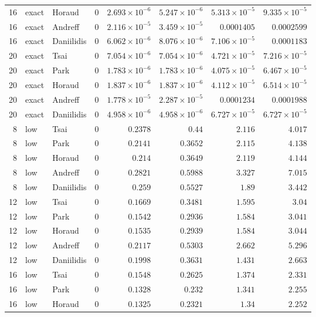 \begin{longtable}{rllrrrrr}
16 & exact & Horaud & 0 & $2.693\times10^{-6}$ & $5.247\times10^{-6}$ & $5.313\times10^{-5}$ & $9.335\times10^{-5}$ \\
16 & exact & Andreff & 0 & $2.116\times10^{-5}$ & $3.459\times10^{-5}$ & $0.0001405$ & $0.0002599$ \\
16 & exact & Daniilidis & 0 & $6.062\times10^{-6}$ & $8.076\times10^{-6}$ & $7.106\times10^{-5}$ & $0.0001183$ \\
20 & exact & Tsai & 0 & $7.054\times10^{-6}$ & $7.054\times10^{-6}$ & $4.721\times10^{-5}$ & $7.216\times10^{-5}$ \\
20 & exact & Park & 0 & $1.783\times10^{-6}$ & $1.783\times10^{-6}$ & $4.075\times10^{-5}$ & $6.467\times10^{-5}$ \\
20 & exact & Horaud & 0 & $1.837\times10^{-6}$ & $1.837\times10^{-6}$ & $4.112\times10^{-5}$ & $6.514\times10^{-5}$ \\
20 & exact & Andreff & 0 & $1.778\times10^{-5}$ & $2.287\times10^{-5}$ & $0.0001234$ & $0.0001988$ \\
20 & exact & Daniilidis & 0 & $4.958\times10^{-6}$ & $4.958\times10^{-6}$ & $6.727\times10^{-5}$ & $6.727\times10^{-5}$ \\
8 & low & Tsai & 0 & $0.2378$ & $0.44$ & $2.116$ & $4.017$ \\
8 & low & Park & 0 & $0.2141$ & $0.3652$ & $2.115$ & $4.138$ \\
8 & low & Horaud & 0 & $0.214$ & $0.3649$ & $2.119$ & $4.144$ \\
8 & low & Andreff & 0 & $0.2821$ & $0.5988$ & $3.327$ & $7.015$ \\
8 & low & Daniilidis & 0 & $0.259$ & $0.5527$ & $1.89$ & $3.442$ \\
12 & low & Tsai & 0 & $0.1669$ & $0.3481$ & $1.595$ & $3.04$ \\
12 & low & Park & 0 & $0.1542$ & $0.2936$ & $1.584$ & $3.041$ \\
12 & low & Horaud & 0 & $0.1535$ & $0.2939$ & $1.584$ & $3.044$ \\
12 & low & Andreff & 0 & $0.2117$ & $0.5303$ & $2.662$ & $5.296$ \\
12 & low & Daniilidis & 0 & $0.1998$ & $0.3631$ & $1.431$ & $2.663$ \\
16 & low & Tsai & 0 & $0.1548$ & $0.2625$ & $1.374$ & $2.331$ \\
16 & low & Park & 0 & $0.1328$ & $0.232$ & $1.341$ & $2.255$ \\
16 & low & Horaud & 0 & $0.1325$ & $0.2321$ & $1.34$ & $2.252$ \\

\end{longtable}

